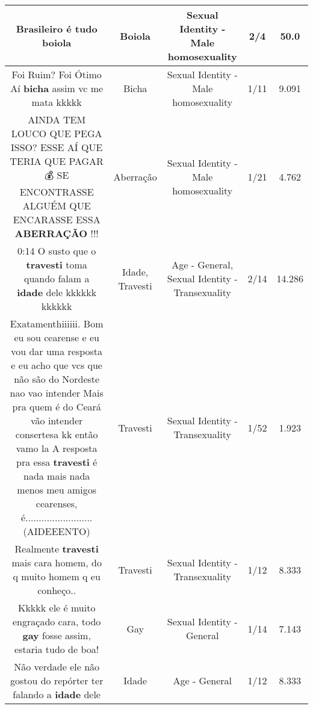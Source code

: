\documentclass[11pt]{article}
\newlength\mylength
\begin{document}
\begin{center}
\begin{longtable}{|C{.65\mylength}|C{.30\mylength}|C{.12\mylength}|C{.12\mylength}|C{.12\mylength}|}
  \small Brasileiro é tudo boiola\normalsize   & Boiola & Sexual Identity - Male homosexuality & 2/4 & 50.0 \\  \hline
  \small Foi Ruim? Foi Ótimo Aí \textbf{bicha} assim vc me mata kkkkk\normalsize   & Bicha & Sexual Identity - Male homosexuality & 1/11 & 9.091 \\  \hline
  \small AINDA TEM LOUCO QUE PEGA ISSO? ESSE AÍ QUE TERIA QUE PAGAR 💰 SE ENCONTRASSE ALGUÉM QUE ENCARASSE ESSA \textbf{ABERRAÇÃO} !!!\normalsize   & Aberração & Sexual Identity - Male homosexuality & 1/21 & 4.762 \\  \hline
  \small 0:14 O susto que o \textbf{travesti} toma quando falam a \textbf{idade} dele kkkkkk kkkkkk\normalsize   & Idade, Travesti & Age - General, Sexual Identity - Transexuality & 2/14 & 14.286 \\  \hline
  \small Exatamenthiiiiii. Bom eu sou cearense e eu vou dar uma resposta e eu acho que vcs que não são do Nordeste nao vao intender Mais pra quem é do Ceará vão intender consertesa kk então vamo la A resposta pra essa \textbf{travesti} é nada mais nada menos meu amigos cearenses, é......................... (AIDEEENTO)\normalsize   & Travesti & Sexual Identity - Transexuality & 1/52 & 1.923 \\  \hline
  \small Realmente \textbf{travesti} mais cara homem, do q muito homem q eu conheço..\normalsize   & Travesti & Sexual Identity - Transexuality & 1/12 & 8.333 \\  \hline
  \small Kkkkk ele é muito engraçado cara, todo \textbf{gay} fosse assim, estaria tudo de boa!\normalsize   & Gay & Sexual Identity - General & 1/14 & 7.143 \\  \hline
  \small Não verdade ele não gostou do repórter ter falando a \textbf{idade} dele\normalsize   & Idade & Age - General & 1/12 & 8.333 \\  \hline

\end{longtable}
\end{center}
\end{document}
